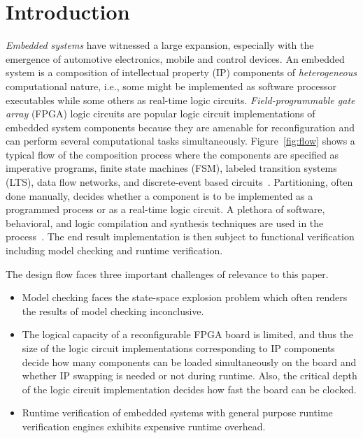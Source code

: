 \section{Introduction}
\label{sect-intro}

\begin{figure*}
\resizebox{1.9\columnwidth}{!}{
  
}
\caption{Embedded system specification, refinement, and implementation stages}
\label{fig:flow}
\end{figure*}

\emph{Embedded systems} have witnessed a large 
expansion, especially with  the emergence of automotive 
electronics, mobile and control devices.
%
An embedded system is a composition of intellectual property (IP) components
of \emph{heterogeneous} computational nature, i.e., some might be implemented as software 
processor executables while some others as real-time logic circuits. 
\emph{Field-programmable gate array} (FPGA) logic circuits are popular logic circuit 
implementations of embedded system components because they are amenable for reconfiguration and can perform several computational tasks simultaneously. 
%
Figure~\ref{fig:flow} shows a typical flow of the composition process where the
components are specified as imperative programs, finite state machines (FSM), labeled 
transition systems (LTS), data flow networks, and discrete-event based circuits~\cite{henzinger2006embedded}.
Partitioning, often done manually, decides whether a component is to 
be implemented as a programmed process or as a real-time logic circuit. 
A plethora of software, behavioral, and logic compilation and synthesis techniques are
used in the process~\cite{metropolis2}.
The end result implementation is then subject to functional verification including 
model checking and runtime verification. 

The design flow faces three important challenges of relevance to this paper. 

\begin{itemize}
\item Model checking faces the state-space explosion problem which often renders the results of model checking inconclusive. 
\item The logical capacity of a reconfigurable FPGA board is limited, and thus the size of the logic circuit implementations corresponding to IP components decide how many components can be loaded simultaneously on the board and whether IP swapping is needed or not during runtime. Also, the critical depth of the logic circuit implementation decides how fast the board can be clocked.
\item Runtime verification of embedded systems with general purpose runtime verification engines exhibits expensive runtime overhead. 
\end{itemize}

